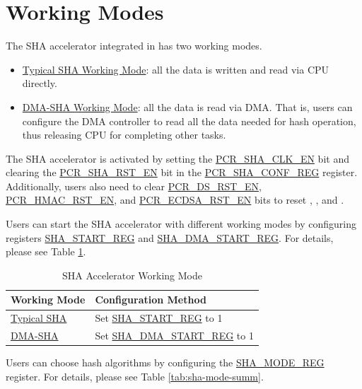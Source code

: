 \documentclass[main\_\_EN.tex]{subfiles}
\begin{document}
\section{Working Modes}
The SHA accelerator integrated in \chipname{} has two working modes.

\begin{itemize}
    \item \hyperref[sec:sha-typical-sha]{Typical SHA Working Mode}: all the data is written and read via CPU directly.
    \item \hyperref[sec:sha-dma-sha]{DMA-SHA Working Mode}: all the data is read via DMA. That is, users can configure the DMA controller to read all the data needed for hash operation, thus releasing CPU for completing other tasks.
\end{itemize}

The SHA accelerator is activated by setting the \hyperref[fielddesc:PCRSHACLKEN]{PCR\_SHA\_CLK\_EN} bit and clearing the \hyperref[fielddesc:PCRSHARSTEN]{PCR\_SHA\_RST\_EN} bit in the \hyperref[regdesc:PCRSHACONFREG]{PCR\_SHA\_CONF\_REG} register. Additionally, users also need to clear \hyperref[fielddesc:PCRDSRSTEN]{PCR\_DS\_RST\_EN}, \hyperref[fielddesc:PCRHMACRSTEN]{PCR\_HMAC\_RST\_EN}, and \hyperref[fielddesc:PCRECDSARSTEN]{PCR\_ECDSA\_RST\_EN} bits to reset , , and .

Users can start the SHA accelerator with different working modes by configuring registers \hyperref[regdesc:SHASTARTREG]{SHA\_START\_REG} and \hyperref[regdesc:SHADMASTARTREG]{SHA\_DMA\_START\_REG}. For details, please see Table \ref{tab:sha-hash-algo-select}.
\begin{longtable}[c]{ | l | l | }
\caption{SHA Accelerator Working Mode}
\label{tab:sha-hash-algo-select}
\\\hline
\rowcolor{lightgray}
\textbf{Working Mode}      & \textbf{Configuration Method}\\
    \hline
    \hyperref[sec:sha-typical-sha]{Typical SHA}      &  Set \hyperref[regdesc:SHASTARTREG]{SHA\_START\_REG} to 1   \\
    \hline
    \hyperref[sec:sha-dma-sha]{DMA-SHA}           &  Set \hyperref[regdesc:SHADMASTARTREG]{SHA\_DMA\_START\_REG} to 1   \\
    \hline
\end{longtable}

Users can choose hash algorithms by configuring the \hyperref[regdesc:SHAMODEREG]{SHA\_MODE\_REG} register. For details, please see Table \ref{tab:sha-mode-summ}.
\end{document}
